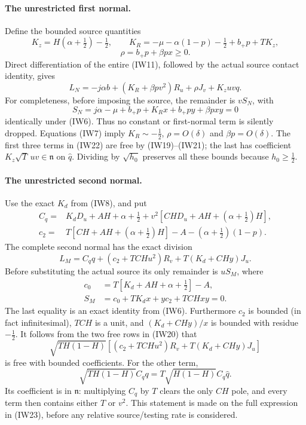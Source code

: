 \paragraph{The unrestricted first normal.}
Define the bounded source quantities
\[
 K_z=H(\alpha+\tfrac12)-\tfrac12,\qquad
 K_R=-\mu-\alpha(1-p)-\tfrac12+b_+p+TK_z,
\]
\[
 \rho=b_+p+\beta px\geq0.
\]
Direct differentiation of the entire (IW11), followed by the actual
source contact identity, gives
\[
 L_N=-j\alpha b+(K_R+\beta pv^2)R_u
                   +\rho J_v+K_zuvq.                 \tag{IW22}
\]
For completeness, before imposing the source, the remainder is
$v S_N$, with
\[
 S_N=j\alpha-\mu+b_+p+K_Rx+b_+py+\beta pxy=0
\]
identically under (IW6). Thus no constant or first-normal term is
silently dropped. Equations (IW7) imply
$K_R\sim-\tfrac12$, $\rho=O(\delta)$ and
$\beta p=O(\delta)$. The first three terms in (IW22) are free by
(IW19)--(IW21); the last has coefficient
$K_z\sqrt T\,uv\in\mathfrak n$ on $\widehat q$.
Dividing by $\sqrt{h_0}$ preserves all these bounds because
$h_0\geq\tfrac12$.

\paragraph{The unrestricted second normal.}
Use the exact $K_d$ from (IW8), and put
\[
\begin{split}
 C_q={}&K_dD_u+AH+\alpha+\tfrac12
        +v^2[CHD_u+AH+(\alpha+\tfrac12)H],\\
 c_2={}&T[CH+AH+(\alpha+\tfrac12)H]
                      -A-(\alpha+\tfrac12)(1-p).
\end{split}
\]
The complete second normal has the exact division
\[
 L_M=C_qq+(c_2+TCHu^2)R_v+T(K_d+CHy)J_u.             \tag{IW23}
\]
Before substituting the actual source its only remainder is $uS_M$,
where
\[
\begin{split}
 c_0&=T[K_d+AH+\alpha+\tfrac12]-A,\\
 S_M&=c_0+TK_dx+yc_2+TCHxy=0.
\end{split}
\]
The last equality is an exact identity from (IW6). Furthermore
$c_2$ is bounded (in fact infinitesimal), $TCH$ is a unit, and
$(K_d+CHy)/x$ is bounded with residue $-\tfrac12$.
It follows from the two free rows in (IW20) that
\[
 \sqrt{TH(1-H)}[(c_2+TCHu^2)R_v+T(K_d+CHy)J_u]
\]
is free with bounded coefficients. For the other term,
\[
 \sqrt{TH(1-H)}C_qq
     =T\sqrt{H(1-H)}C_q\widehat q.
\]
Its coefficient is in $\mathfrak n$: multiplying $C_q$ by $T$
clears the only $CH$ pole, and every term then contains either
$T$ or $v^2$. This statement is made on the full expression in
(IW23), before any relative source/testing rate is considered.

